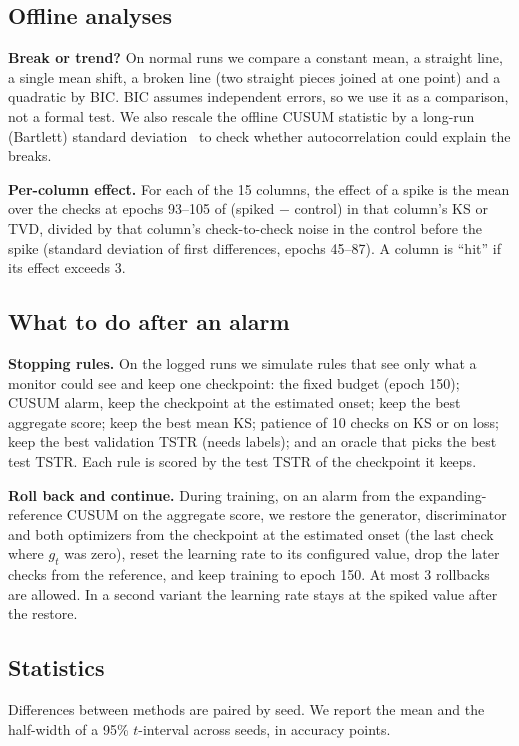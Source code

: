 \documentclass[conference]{IEEEtran}
\begin{document}
\subsection{Offline analyses}
\textbf{Break or trend?} On normal runs we compare a constant mean, a
straight line, a single mean shift, a broken line (two straight pieces joined
at one point) and a quadratic by BIC. BIC assumes independent errors, so we
use it as a comparison, not a formal test. We also rescale the offline CUSUM
statistic by a long-run (Bartlett) standard deviation~\cite{newey1987hac} to
check whether autocorrelation could explain the breaks.

\textbf{Per-column effect.} For each of the 15 columns, the effect of a spike
is the mean over the checks at epochs 93--105 of (spiked $-$ control) in that
column's KS or TVD, divided by that column's check-to-check noise in the
control before the spike (standard deviation of first differences, epochs
45--87). A column is ``hit'' if its effect exceeds 3.

\subsection{What to do after an alarm}
\textbf{Stopping rules.} On the logged runs we simulate rules that see only
what a monitor could see and keep one checkpoint: the fixed budget (epoch
150); CUSUM alarm, keep the checkpoint at the estimated onset; keep the best
aggregate score; keep the best mean KS; patience of 10 checks on KS or on
loss; keep the best validation TSTR (needs labels); and an oracle that picks
the best test TSTR. Each rule is scored by the test TSTR of the checkpoint
it keeps.

\textbf{Roll back and continue.} During training, on an alarm from the
expanding-reference CUSUM on the aggregate score, we restore the generator,
discriminator and both optimizers from the checkpoint at the estimated onset
(the last check where $g_t$ was zero), reset the learning rate to its
configured value, drop the later checks from the reference, and keep
training to epoch 150. At most 3 rollbacks are allowed. In a second variant
the learning rate stays at the spiked value after the restore.

\subsection{Statistics}
Differences between methods are paired by seed. We report the mean and the
half-width of a 95\% $t$-interval across seeds, in accuracy points.
\end{document}
